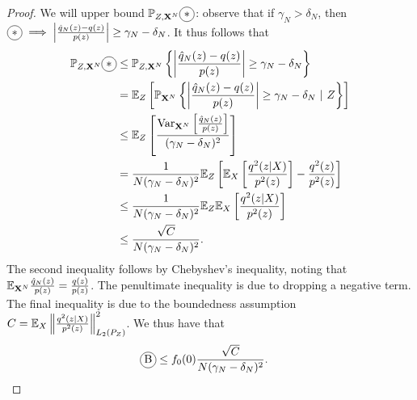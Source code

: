 \begin{proof}
We will upper bound $\mathbb{P}_{Z,\XN} \encircle{$*$}$:
observe that if $\gamma_N > \delta_N$, then  $\encircle{$*$}\implies \left| \frac{\hat{q}_N(z) - q(z)}{p(z)} \right| \geq \gamma_N - \delta_N$.
It thus follows that
\begin{align*}
    \mathbb{P}_{Z,\XN} \encircle{$*$} &\leq  \mathbb{P}_{Z,\XN} \left\lbrace \left| \frac{\hat{q}_N(z) - q(z)}{p(z)} \right| \geq \gamma_N - \delta_N  \right\rbrace\\
    &= \mathbb{E}_Z\left[ \mathbb{P}_{\XN} \left\lbrace \left| \frac{\hat{q}_N(z) - q(z)}{p(z)} \right| \geq \gamma_N - \delta_N  \  | \ Z \right\rbrace \right]\\
    &\leq \mathbb{E}_Z\left[ 
    \frac{\text{Var}_{\XN}\left[ 
    \frac{\hat{q}_N(z)}{p(z)}
    \right]}{(\gamma_N - \delta_N)^2}
    \right]\\
    &= \frac{1}{N(\gamma_N - \delta_N)^2}  \E_Z \left[ \E_{X}\left[
     \frac{q^2(z|X)}{p^2(z)}\right] - \frac{q^2(z)}{p^2(z)} \right]\\
    &\leq \frac{1}{N(\gamma_N - \delta_N)^2}  \E_Z \E_{X}\left[
     \frac{q^2(z|X)}{p^2(z)}\right]\\
    &\leq \frac{\sqrt{C} }{N(\gamma_N - \delta_N)^2}.\\
\end{align*}
The second inequality follows by Chebyshev's inequality, noting that $\mathbb{E}_{\mathbf{X}^N} \frac{\hat{q}_N(z)}{p(z)} = \frac{q(z)}{p(z)}$.
The penultimate inequality is due to dropping a negative term.
The final inequality is due to the boundedness assumption $C =  \mathbb{E}_{X}\left\| \frac{q^2(z|X)}{p^2(z)} \right\|^2_{L_2(P_Z)}$.
We thus have that 
\begin{align*}
    \encircle{B}
    &\leq f_0(0) \frac{\sqrt{C}}{N (\gamma_N - \delta_N)^2}.
\end{align*}



\end{proof}
